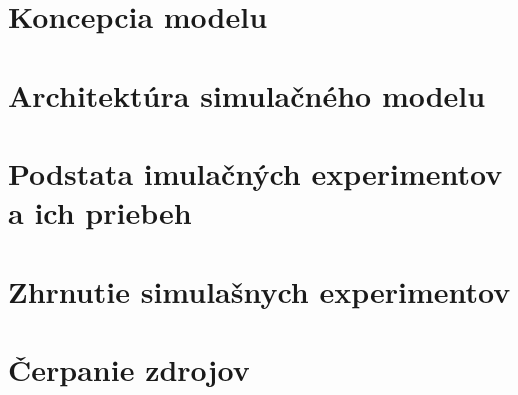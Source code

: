 \documentclass[a4paper, 10pt]{article}
\begin{document}
    \section {Koncepcia modelu}


    \section{Architektúra simulačného modelu}

    \section{Podstata imulačných experimentov a ich priebeh}

    \section{Zhrnutie simulašnych experimentov}

    \section {Čerpanie zdrojov}
        {\cite{example}}

    \newpage
    
    
\end{document}
